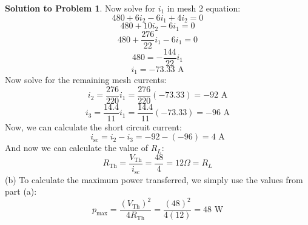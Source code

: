 \documentclass[11pt,letterpaper]{article}
\theoremstyle{definition}
\newtheorem{solprob}{\textcolor{solproblemcolor}{Solution to Problem}}  %
\begin{document}
\begin{solprob}
    Now solve for $i_1$ in mesh 2 equation:
    \[480+6i_2-6i_1+4i_2=0\]
    \[480+10i_2-6i_1=0\]
    \[480+\frac{276}{22}i_1-6i_1=0\]
    \[480=-\frac{144}{22}i_1\]
    \[i_1=-73.33 \text{ A}\]
    Now solve for the remaining mesh currents:
    \[i_2=\frac{276}{220}i_1=\frac{276}{220}(-73.33) = -92 \text{ A}\]
    \[i_3 = \frac{14.4}{11}i_1 = \frac{14.4}{11}(-73.33) = -96 \text{ A}\]
    Now, we can calculate the short circuit current:
    \[i_\text{sc} = i_2-i_3=-92-(-96)=4 \text{ A}\]
    And now we can calculate the value of $R_L$:
    \[R_\text{Th} = \frac{V_\text{Th}}{i_\text{sc}} = \frac{48}{4} = 12\Omega = R_L\]
    (b) To calculate the maximum power transferred, we simply use the values from part (a):
    \[p_\text{max} = \frac{(V_\text{Th})^2}{4R_\text{Th}} = \frac{(48)^2}{4(12)} = 48 \text{ W}\]
\end{solprob}

\end{document}
